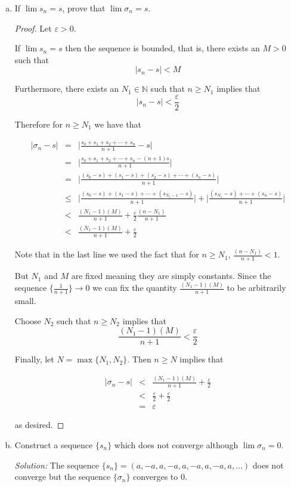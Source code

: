 \documentclass{tufte-book}
\theoremstyle{definition}
\numberwithin{section}{chapter}
\begin{document}
 \begin{enumerate}[(a)]
 	\item  If $\lim s_{n} = s$, prove that $\lim \sigma_{n} = s$.
	
	\begin{proof}
			Let $\varepsilon >0$.
			
			If $\lim s_{n} = s$  then the sequence is bounded, that is, there exists an $M >0$ such that $$ |s_n - s| < M $$
			
			Furthermore, there exists an $N_{1} \in \mathbb{N}$ such that $n \geq N_{1}$ implies that $$  |s_n - s|< \frac{\varepsilon}{2} $$
			
			Therefore for $n \geq N_{1}$ we have that 
			
			\begin{eqnarray*}
|\sigma_n - s|  &=& \big|\frac{s_0 + s_1 + s_2 + \cdots + s_n}{n+1}  - s\big|  \\
   	&=& \big|\frac{s_0 + s_1 + s_2 + \cdots + s_n - (n+1)s}{n+1}\big| \\
   &=& \big|\frac{(s_0-s) + (s_1 -s) + (s_2 -s)  + \cdots + (s_n - s)}{n+1}\big| \\
   &\leq & \big|\frac{(s_0-s) + (s_1 -s) +\cdots + (s_{N_{1} - 1} -s) }{n+1}\big|  + \big|\frac{(s_{N_{1}} -s) + \cdots + (s_n - s)}{n+1}\big| \\
   &<& \frac{(N_{1} - 1 )(M)}{n+1}  + \frac{\varepsilon}{2}\frac{(n - N_{1})}{n+1}\\
   &<& \frac{(N_{1} - 1 )(M)}{n+1}  + \frac{\varepsilon}{2}
\end{eqnarray*}

Note that in the last line we used the fact that for $n \geq N_1$, $\frac{(n - N_{1})}{n+1} < 1$. 


But $N_{1}$ and $M$ are fixed meaning they are simply constants.  Since the sequence $\{\frac{1}{n+1}\} \rightarrow 0$ we can fix the quantity $\frac{(N_{1} - 1 )(M)}{n+1}$ to be arbitrarily small.

Choose $N_2$ such that $n \geq N_2$ implies that $$ \frac{(N_{1} - 1 )(M)}{n+1} < \frac{\varepsilon}{2} $$




Finally, let $N = \max\{N_1, N_2\}$.   Then $n \geq N$ implies that 


\begin{eqnarray*}
|\sigma_n - s|  &<& \frac{(N_{1} - 1 )(M)}{n+1}  + \frac{\varepsilon}{2}\\
		&<& \frac{\varepsilon}{2} + \frac{\varepsilon}{2} \\
		&=&  \varepsilon
\end{eqnarray*}

as desired.	
	\end{proof}
	\item  Construct a sequence $\{s_{n}\}$ which does not converge although $\lim \sigma_{n} = 0$.
	
	\noindent
	\emph{Solution:}   The sequence $\{s_{n}\} = (a, -a, a, -a, a, -a, a, -a, a, \ldots )$ does not converge but the sequence $\{\sigma_{n}\}$ converges to $0$.
 \end{enumerate}
\end{document}
